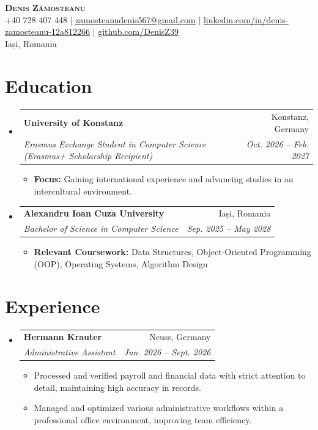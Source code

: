 \documentclass[letterpaper,11pt]{article}
\makeatletter
\newcommand{\resumeItem}[1]{
  \item\small{
    {#1 \vspace{-2pt}}
  }
}
\newcommand{\resumeSubheading}[4]{
  \vspace{-2pt}\item
    \begin{tabular*}{0.97\textwidth}[t]{l@{\extracolsep{\fill}}r}
      \textbf{#1} & #2 \\
      \textit{\small#3} & \textit{\small #4} \\
    \end{tabular*}\vspace{-7pt}
}
\newcommand{\resumeSubHeadingListStart}{\begin{itemize}[leftmargin=0.15in, label={}]}
\newcommand{\resumeSubHeadingListEnd}{\end{itemize}}
\newcommand{\resumeItemListStart}{\begin{itemize}}
\newcommand{\resumeItemListEnd}{\end{itemize}\vspace{-5pt}}
\makeatother
\begin{document}
\begin{center}
    \textbf{\Huge \scshape Denis Zămosteanu} \\ \vspace{1pt}
    \small +40 728 407 448 $|$ \href{mailto:zamosteanudenis567@gmail.com}{\underline{zamosteanudenis567@gmail.com}} $|$ 
    \href{https://linkedin.com/in/denis-zamosteanu-12a812266}{\underline{linkedin.com/in/denis-zamosteanu-12a812266}} $|$
    \href{https://github.com/DenisZ39}{\underline{github.com/DenisZ39}} \\
    \small Iași, Romania
\end{center}

\section{Education}
  \resumeSubHeadingListStart
    \resumeSubheading
      {University of Konstanz}{Konstanz, Germany}
      {Erasmus Exchange Student in Computer Science (Erasmus+ Scholarship Recipient)}{Oct. 2026 -- Feb. 2027}
      \resumeItemListStart
        \resumeItem{\textbf{Focus:} Gaining international experience and advancing studies in an intercultural environment.}
      \resumeItemListEnd
    \resumeSubheading
      {Alexandru Ioan Cuza University}{Iași, Romania}
      {Bachelor of Science in Computer Science}{Sep. 2025 -- May 2028}
      \resumeItemListStart
        \resumeItem{\textbf{Relevant Coursework:} Data Structures, Object-Oriented Programming (OOP), Operating Systems, Algorithm Design}
      \resumeItemListEnd
  \resumeSubHeadingListEnd

\section{Experience}
  \resumeSubHeadingListStart

    \resumeSubheading
      {Hermann Krauter}{Neuss, Germany}
      {Administrative Assistant}{Jun. 2026 -- Sept. 2026}
      \resumeItemListStart
        \resumeItem{Processed and verified payroll and financial data with strict attention to detail, maintaining high accuracy in records.}
        \resumeItem{Managed and optimized various administrative workflows within a professional office environment, improving team efficiency.}
      \resumeItemListEnd

  \resumeSubHeadingListEnd

\end{document}
